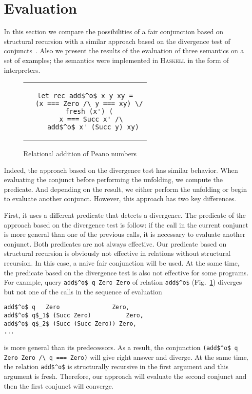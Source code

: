 \section{Evaluation}
\label{sec:eval}

In this section we compare the possibilities of a fair conjunction based on structural recursion with a similar approach based on the divergence test of conjuncts~\cite{fair:DivTest}. Also we present the results of the evaluation of three semantics on a set of examples; the semantics were implemented in \textsc{Haskell} in the form of interpreters.

\begin{figure}[h!]
\centering
\begin{tabular}{c}
\begin{lstlisting}
let rec add$^o$ x y xy =
  (x === Zero /\ y === xy) \/
  fresh (x') (
    x === Succ x' /\ 
    add$^o$ x' (Succ y) xy)
\end{lstlisting}
\end{tabular}
\caption{Relational addition of Peano numbers}
\label{fair:lst-addo}
\end{figure}

Indeed, the approach based on the divergence test has similar behavior. When evaluating the conjunct before performing the unfolding, we compute the predicate. And depending on the result, we either perform the unfolding or begin to evaluate another conjunct. However, this approach has two key differences.

First, it uses a different predicate that detects a divergence. The predicate of the approach based on the divergence test is follow: if the call in the current conjunct is more general than one of the previous calls, it is necessary to evaluate another conjunct. Both predicates are not always effective. Our predicate based on structural recursion is obviously not effective in relations without structural recursion. In this case, a naive fair conjunction will be used.
At the same time, the predicate based on the divergence test is also not effective for some programs. For example, query \lstinline{add$^o$ q Zero Zero} of relation \lstinline{add$^o$} (Fig.~\ref{fair:lst-addo}) diverges but not one of the calls in the sequence of evaluation 
\begin{lstlisting}
add$^o$ q   Zero               Zero, 
add$^o$ q$_1$ (Succ Zero)          Zero, 
add$^o$ q$_2$ (Succ (Succ Zero)) Zero, 
...
\end{lstlisting}
\noindent is more general than its predecessors. As a result, the conjunction \linebreak \lstinline{(add$^o$ q Zero Zero /\ q === Zero)} will give right answer and diverge. At the same time, the relation \lstinline{add$^o$} is structurally recursive in the first argument and this argument is fresh. Therefore, our approach will evaluate the second conjunct and then the first conjunct will converge.

